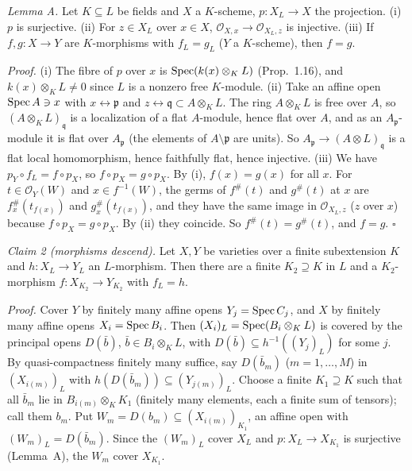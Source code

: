 \documentclass[11pt]{article}
\begin{document}
\emph{Lemma A.} Let $K\subseteq L$ be fields and $X$ a $K$-scheme, $p:X_L\to X$ the projection. (i) $p$ is surjective. (ii) For $z\in X_L$ over $x\in X$, $\mathcal O_{X,x}\to\mathcal O_{X_L,z}$ is injective. (iii) If $f,g:X\to Y$ are $K$-morphisms with $f_L=g_L$ ($Y$ a $K$-scheme), then $f=g$.

\emph{Proof.} (i) The fibre of $p$ over $x$ is $\operatorname{Spec}(k(x)\otimes_KL)$ (Prop.~1.16), and $k(x)\otimes_KL\ne0$ since $L$ is a nonzero free $K$-module. (ii) Take an affine open $\operatorname{Spec} A\ni x$ with $x\leftrightarrow\mathfrak p$ and $z\leftrightarrow\mathfrak q\subset A\otimes_KL$. The ring $A\otimes_KL$ is free over $A$, so $(A\otimes_KL)_{\mathfrak q}$ is a localization of a flat $A$-module, hence flat over $A$, and as an $A_{\mathfrak p}$-module it is flat over $A_{\mathfrak p}$ (the elements of $A\setminus\mathfrak p$ are units). So $A_{\mathfrak p}\to(A\otimes L)_{\mathfrak q}$ is a flat local homomorphism, hence faithfully flat, hence injective. (iii) We have $p_Y\circ f_L=f\circ p_X$, so $f\circ p_X=g\circ p_X$. By (i), $f(x)=g(x)$ for all $x$. For $t\in\mathcal O_Y(W)$ and $x\in f^{-1}(W)$, the germs of $f^\#(t)$ and $g^\#(t)$ at $x$ are $f^\#_x(t_{f(x)})$ and $g^\#_x(t_{f(x)})$, and they have the same image in $\mathcal O_{X_L,z}$ ($z$ over $x$) because $f\circ p_X=g\circ p_X$. By (ii) they coincide. So $f^\#(t)=g^\#(t)$, and $f=g$. \hfill$\square$

\emph{Claim 2 (morphisms descend).} Let $X,Y$ be varieties over a finite subextension $K$ and $h:X_L\to Y_L$ an $L$-morphism. Then there are a finite $K_2\supseteq K$ in $L$ and a $K_2$-morphism $f:X_{K_2}\to Y_{K_2}$ with $f_L=h$.

\emph{Proof.} Cover $Y$ by finitely many affine opens $Y_j=\operatorname{Spec} C_j$, and $X$ by finitely many affine opens $X_i=\operatorname{Spec} B_i$. Then $(X_i)_L=\operatorname{Spec}(B_i\otimes_KL)$ is covered by the principal opens $D(\bar b)$, $\bar b\in B_i\otimes_KL$, with $D(\bar b)\subseteq h^{-1}((Y_j)_L)$ for some $j$. By quasi-compactness finitely many suffice, say $D(\bar b_m)$ ($m=1,\dots,M$) in $(X_{i(m)})_L$ with $h(D(\bar b_m))\subseteq(Y_{j(m)})_L$. Choose a finite $K_1\supseteq K$ such that all $\bar b_m$ lie in $B_{i(m)}\otimes_KK_1$ (finitely many elements, each a finite sum of tensors); call them $b_m$. Put $W_m=D(b_m)\subseteq(X_{i(m)})_{K_1}$, an affine open with $(W_m)_L=D(\bar b_m)$. Since the $(W_m)_L$ cover $X_L$ and $p:X_L\to X_{K_1}$ is surjective (Lemma~A), the $W_m$ cover $X_{K_1}$.
\end{document}
